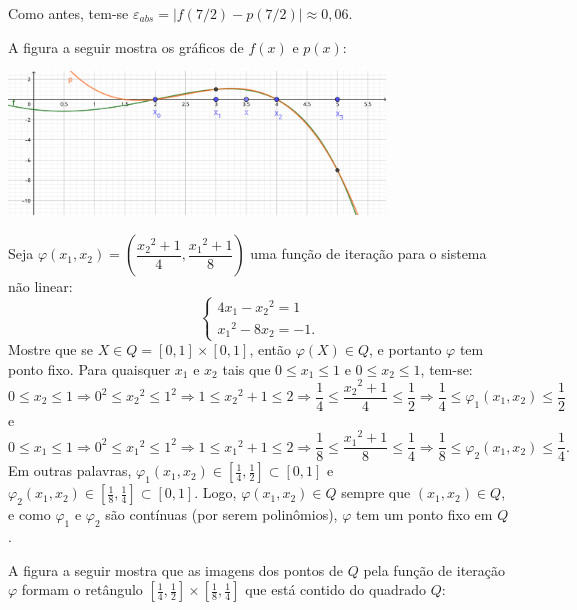 \documentclass[12pt,a4paper]{article}
\begin{document}
\begin{ExerciseList}
Como antes, tem-se $\varepsilon_{abs} = |f(7/2) - p(7/2)| \approx 0,06$.

A figura a seguir mostra os gráficos de $f(x)$ e $p(x)$:

\begin{center}
  \includegraphics[width=10.0cm]{img/4-interpolação-diferenças-divididas-newton.pdf}
\end{center}


\Exercise[title={2,0}]
Seja $\varphi(x_1, x_2) = \left(\dfrac{{x_2}^2+1}{4}, \dfrac{{x_1}^2+1}{8}\right)$ uma função de iteração para o sistema não linear:
\[
  \begin{cases}
  4x_1-{x_2}^2 = 1\\
  {x_1}^2-8x_2 = -1.
  \end{cases}
\]
Mostre que se $X \in Q = [0, 1] \times [0,1]$, então $\varphi(X) \in Q$, e portanto $\varphi$ tem ponto fixo.
\Answer Para quaisquer $x_1$ e $x_2$ tais que $0 \leq x_1 \leq 1$ e $0 \leq x_2 \leq 1$, tem-se:
\[
  0 \leq x_2 \leq 1
  \Rightarrow
  0^2 \leq {x_2}^2 \leq 1^2
  \Rightarrow
  1 \leq {x_2}^2+1 \leq 2
  \Rightarrow
  \frac{1}{4} \leq \frac{{x_2}^2+1}{4} \leq \frac{1}{2}
  \Rightarrow
  \frac{1}{4} \leq \varphi_1(x_1, x_2) \leq \frac{1}{2}
\]
e
\[
  0 \leq x_1 \leq 1
  \Rightarrow
  0^2 \leq {x_1}^2 \leq 1^2
  \Rightarrow
  1 \leq {x_1}^2+1 \leq 2
  \Rightarrow
  \frac{1}{8} \leq \frac{{x_1}^2+1}{8} \leq \frac{1}{4}
  \Rightarrow
  \frac{1}{8} \leq \varphi_2(x_1, x_2) \leq \frac{1}{4}.
\]
Em outras palavras, $\varphi_1(x_1, x_2) \in \left[\frac{1}{4}, \frac{1}{2}\right] \subset [0, 1]$ e $\varphi_2(x_1, x_2) \in \left[\frac{1}{8}, \frac{1}{4}\right] \subset [0, 1]$. Logo, $\varphi(x_1, x_2) \in Q$ sempre que $(x_1, x_2) \in Q$, e como $\varphi_1$ e $\varphi_2$ são contínuas (por serem polinômios), $\varphi$ tem um ponto fixo em $Q$.

A figura a seguir mostra que as imagens dos pontos de $Q$ pela função de iteração $\varphi$ formam o retângulo $\left[\frac{1}{4}, \frac{1}{2}\right] \times [\frac{1}{8}, \frac{1}{4}]$ que está contido do quadrado $Q$:


\end{ExerciseList}
\end{document}
